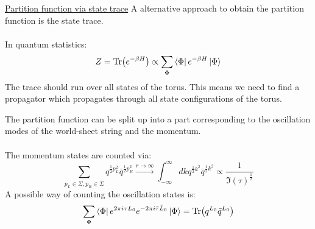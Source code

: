 \documentclass[11pt,aspectratio=169]{beamer}
\begin{document}
\begin{frame}{\underline{Partition function via state trace}}
	A alternative approach to obtain the partition function is the state trace.
	\\~\\
	In quantum statistics:
	\begin{equation}
		Z = \Tr(e^{-\beta H}) \propto \sum_{\Phi}\bra{\Phi} e^{-\beta H} \ket{\Phi}
	\end{equation}
	The trace should run over all states of the torus. This means we need to find a propagator 
	which propagates through all state configurations of the torus.
	

\end{frame}

\begin{frame}
 	The partition function can be split up into a part corresponding to the oscillation modes of the world-sheet string and the momentum.
	\\~\\
	The momentum states are counted via:
	\begin{equation}
		\sum_{p_L\in\Sigma, p_R\in\bar{\Sigma}} q^{\frac{1}{2}p_L^2}\bar{q}^{\frac{1}{2}p_R^2}  \xrightarrow{\text{$r \rightarrow \infty$}} \int_{-\infty}^{\infty}dk q^{\frac{1}{2}k^2}\bar{q}^{\frac{1}{2}k^2} \propto \frac{1}{\Im(\tau)^{\frac{1}{2}}}
	\end{equation}	
	A possible way of counting the oscillation states is:
	\begin{equation}
		\sum_{\Phi} \bra{\Phi} e^{2\pi i \tau L_0}e^{-2\pi i \bar{\tau} \bar{L}_0} \ket{\Phi} = \Tr(q^{L_0}\bar{q}^{L_0})
	\end{equation}
\end{frame}
\end{document}
